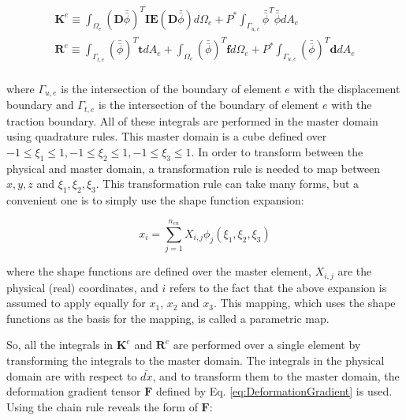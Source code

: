 \documentclass[10pt]{article}
\begin{document}
\begin{tcolorbox}
\begin{equation}
\label{eq:FEWeakForm_element}
\begin{aligned}
\textbf{K}^e\equiv\int_{\Omega_e}(\textbf{D}\bar{\bar{\phi}})^T\textbf{IE}(\textbf{D}\bar{\bar{\phi}})d\Omega_e +P^{*}\int_{\Gamma_{u,e}}\bar{\bar{\phi}}^T\bar{\bar{\phi}}dA_e\\
\textbf{R}^e\equiv\int_{\Gamma_{t,e}}(\bar{\bar{\phi}})^T\textbf{t}dA_e+\int_{\Omega_e}(\bar{\bar{\phi}})^T\textbf{f}d\Omega_e+P^{*}\int_{\Gamma_{u,e}}(\bar{\bar{\phi}})^T\textbf{d}dA_e\\
\end{aligned}
\end{equation}
\end{tcolorbox}

where \(\Gamma_{u,e}\) is the intersection of the boundary of element \(e\) with the displacement boundary and \(\Gamma_{t,e}\) is the intersection of the boundary of element \(e\) with the traction boundary. All of these integrals are performed in the master domain using quadrature rules. This master domain is a cube defined over \(-1\leq\xi_1\leq1, -1\leq\xi_2\leq1, -1\leq\xi_3\leq1\). In order to transform between the physical and master domain, a transformation rule is needed to map between \(x,y,z\) and \(\xi_1,\xi_2,\xi_3\). This transformation rule can take many forms, but a convenient one is to simply use the shape function expansion:

\begin{equation}
x_i=\sum_{j=1}^{n_{en}}X_{i,j}\phi_j(\xi_1,\xi_2,\xi_3)
\end{equation}

where the shape functions are defined over the master element, \(X_{i,j}\) are the physical (real) coordinates, and \(i\) refers to the fact that the above expansion is assumed to apply equally for \(x_1\), \(x_2\) and \(x_3\). This mapping, which uses the shape functions as the basis for the mapping, is called a parametric map. 

So, all the integrals in \(\textbf{K}^e\) and \(\textbf{R}^e\) are performed over a single element by transforming the integrals to the master domain. The integrals in the physical domain are with respect to \(\bar{dx}\), and to transform them to the master domain, the deformation gradient tensor \(\textbf{F}\) defined by Eq. \eqref{eq:DeformationGradient} is used. Using the chain rule reveals the form of \(\textbf{F}\):
\end{document}
